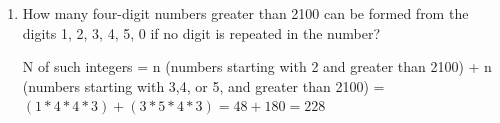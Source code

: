 \documentclass[12pt]{article}
\begin{document}
\begin{enumerate}
For 2 digit numbers there are $2^2$ possible numbers - 88,99,89,98

...

For 6 digit numbers there are $2^6$ possible numbers

So the total number of such integers is $2 + 2^2 + 2^3 + 2^4 + 2^5 + 2^6=126$ 


\item How many four-digit numbers greater than 2100 can be formed from the digits
1, 2, 3, 4, 5, 0 if no digit is repeated in the number?

N of such integers = n (numbers starting with 2 and greater than 2100) + n (numbers starting with 3,4, or 5, and greater than 2100) = $(1*4*4*3) + (3*5*4*3) = 48 + 180 = 228$ 


\end{enumerate}
\end{document}
